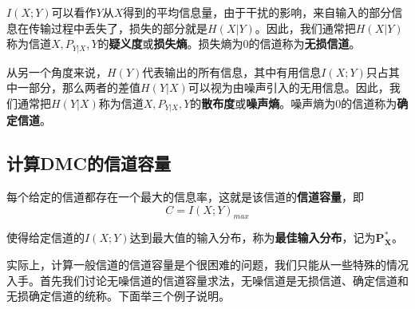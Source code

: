 \documentclass[UTF8,a4paper,11pt]{article}
\begin{document}
$I(X;Y)$可以看作$Y$从$X$得到的平均信息量，由于干扰的影响，来自输入的部分信息在传输过程中丢失了，损失的部分就是$H(X|Y)$。因此，我们通常把$H(X|Y)$称为信道${X,P_{Y|X},Y}$的\textbf{疑义度}或\textbf{损失熵}。损失熵为0的信道称为\textbf{无损信道}。

从另一个角度来说，$H(Y)$代表输出的所有信息，其中有用信息$I(X;Y)$只占其中一部分，那么两者的差值$H(Y|X)$可以视为由噪声引入的无用信息。因此，我们通常把$H(Y|X)$称为信道${X,P_{Y|X},Y}$的\textbf{散布度}或\textbf{噪声熵}。噪声熵为0的信道称为\textbf{确定信道}。

\subsection{计算DMC的信道容量}
每个给定的信道都存在一个最大的信息率，这就是该信道的\textbf{信道容量}，即
\begin{equation}
C=I(X;Y)_{max}
\end{equation}

使得给定信道的$I(X;Y)$达到最大值的输入分布，称为\textbf{最佳输入分布}，记为$\bm{P^*_X}$。

实际上，计算一般信道的信道容量是个很困难的问题，我们只能从一些特殊的情况入手。首先我们讨论无噪信道的信道容量求法，无噪信道是无损信道、确定信道和无损确定信道的统称。下面举三个例子说明。
\end{document}
